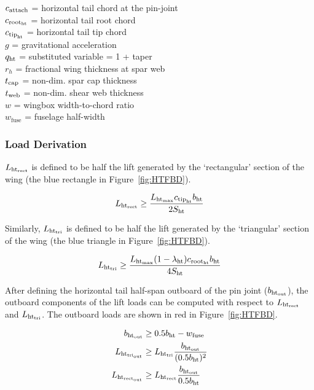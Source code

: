 \begin{tabbing}
$c_{\rm{attach}}$ = horizontal tail chord at the pin-joint \\
$c_{\rm{root}_{\rm{ht}}}$ = horizontal tail root chord \\
$c_{\rm{tip}_{\rm{ht}}}$ = horizontal tail tip chord \\
$g$ = gravitational acceleration \\
$q_{\rm{ht}}$ = substituted variable = 1 + taper \\
$r_h$ = fractional wing thickness at spar web \\
$t_{\rm{cap}}$ = non-dim. spar cap thickness \\
$t_{\rm{web}}$ = non-dim. shear web thickness \\
$w$ = wingbox width-to-chord ratio \\
$w_{\textrm{fuse}}$ = fuselage half-width \\
\end{tabbing}

\subsubsection{Load Derivation}

$L_{\rm{ht}_{rect}}$ is defined to be half the lift generated by the `rectangular' 
section of the wing (the blue rectangle in Figure~\ref{fig:HTFBD}).

\begin{equation}
    L_{\rm{ht}_{rect}} \geq \frac{L_{\rm{ht}_{\rm{max}}} c_{\rm{tip}_{\rm{ht}}} b_{\rm{ht}}}{2 S_{\rm{ht}}}
\end{equation}

Similarly, $L_{\rm{ht}_{\rm{tri}}}$ is defined to be half the lift generated by the 
`triangular' section of the wing (the blue triangle in Figure~\ref{fig:HTFBD}).
 
\begin{equation}
     L_{\rm{ht}_{\rm{\rm{tri}}}} \geq \frac{L_{\rm{ht}_{\rm{max}}} (1 - \lambda_{\rm{ht}}) c_{\rm{root}_{\rm{ht}}} b_{\rm{ht}}}{4 
S_{\rm{ht}}}
\end{equation}
 
After defining the horizontal tail half-span outboard of the pin joint 
($b_{\rm{ht}_{\rm{out}}}$), the outboard components of the lift loads   can be computed 
with respect to $L_{\rm{ht}_{rect}}$ and $L_{\rm{ht}_{\rm{tri}}}$. The outboard loads are shown 
in red in Figure~\ref{fig:HTFBD}. 
 
 \begin{align}
     b_{\rm{ht}_{\rm{out}}} &\geq 0.5b_{\rm{ht}} - w_{\textrm{fuse}}\\
     L_{\rm{ht}_{tri_{\rm{out}}}} &\geq L_{\rm{ht}_{\rm{tri}}} \frac{b_{\rm{ht}_{\rm{out}}}}{(0.5b_{\rm{ht}})^2}\\
     L_{\rm{ht}_{\rm{rect}_{\rm{out}}}} &\geq L_{\rm{ht}_{rect}} \frac{b_{\rm{ht}_{\rm{out}}}}{0.5b_{\rm{ht}}}
 \end{align}
 
